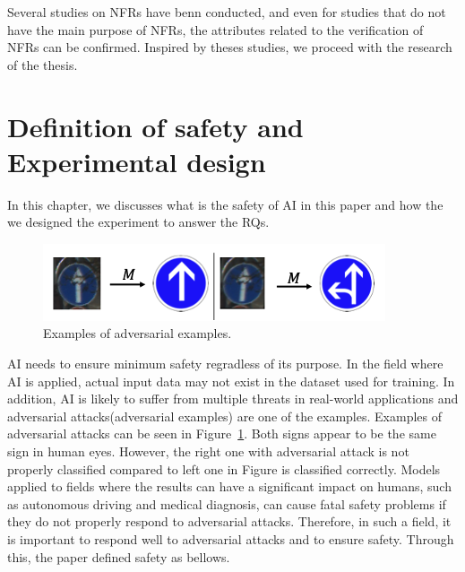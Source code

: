 \documentclass[journal,article,submit,moreauthors,pdftex]{Definitions/mdpi}
\begin{document}
Several studies on NFRs have benn conducted, and even for studies that do not have the main purpose of NFRs, the attributes related to the verification of NFRs can be confirmed.
Inspired by theses studies, we proceed with the research of the thesis.

\section{Definition of safety and Experimental design} %




In this chapter, we discusses what is the safety of AI in this paper and how the we designed the experiment to answer the RQs.

\begin{figure}[H]
\includegraphics[width=13 cm]{Definitions/example-of-adversarial.png}
\caption{Examples of adversarial examples.\label{example-of-adversarial}}
\end{figure}   

AI needs to ensure minimum safety regradless of its purpose. In the field where AI is applied, actual input data may not exist in the dataset used for training.
In addition, AI is likely to suffer from multiple threats in real-world applications and adversarial attacks(adversarial examples) are one of the examples.
Examples of adversarial attacks can be seen in Figure~\ref{example-of-adversarial}. Both signs appear to be the same sign in human eyes. However, the right one with adversarial attack is not properly classified compared to left one in Figure is classified correctly.
Models applied to fields where the results can have a significant impact on humans, such as autonomous driving and medical diagnosis, can cause fatal safety problems if they do not properly respond to adversarial attacks. Therefore, in such a field, it is important to respond well to adversarial attacks and to ensure safety.
Through this, the paper defined safety as bellows.
\end{document}
